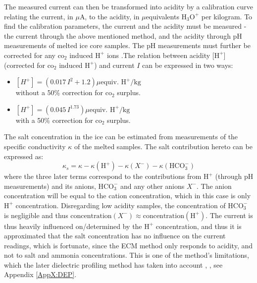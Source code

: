 \documentclass[../../CompleteThesis2/Complete_2ndDraft]{subfiles}
\begin{document}

The measured current can then be transformed into acidity by a calibration curve relating the current, in $\mu$A, to the acidity, in $\mu$equivalents $\text{H}_3\text{O}^+$ per kilogram. To find the calibration parameters, the current and the acidity must be measured - the current through the above mentioned method, and the acidity through pH measurements of melted ice core samples. The pH measurements must further be corrected for any $\text{co}_2$ induced $\text{H}^+$ ions \cite[K. Taylor et al., 1993]{Taylor1993}.The relation between acidity [$\text{H}^+$] (corrected for $\text{co}_2$ induced $\text{H}^+$) and current $I$ can be expressed in two ways:
\begin{itemize}
	\item $[H^+] = (0.017\, I^2 + 1.2) \mu \text{equiv. H}^+ /\text{kg}$\\
	without a 50\% correction for $\text{co}_2$ surplus.
	\item $[H^+] = (0.045\, I^{1.73}) \mu \text{equiv. H}^+ /\text{kg}$\\
	with a 50\% correction for $\text{co}_2$ surplus.
\end{itemize}
The salt concentration in the ice can be estimated from measurements of the specific conductivity $\kappa$ of the melted samples. The salt contribution hereto can be expressed as:
\begin{equation}
	\kappa_s = \kappa - \kappa(\text{H}^+) - \kappa(X^-) - \kappa(\text{HCO}_3^-)
\end{equation}
where the three later terms correspond to the contributions from $\text{H}^+$ (through pH measurements) and its anions\footnotemark, $\text{HCO}_3^-$ and any other anions $X^-$. The anion concentration will be equal to the cation concentration, which in this case is only $\text{H}^+$ concentration. Disregarding low acidity samples, the concentration of $\text{HCO}_3^-$ is negligible and thus  $\text{concentration}(X^-) \approx \text{concentration}(\text{H}^+)$. 
The current is thus heavily influenced on/determined by the $\text{H}^+$ concentration, and thus it is approximated that the salt concentration has no influence on the current readings, which is fortunate, since the ECM method only responds to acidity, and not to salt and ammonia concentrations. This is one of the method's limitations, which the later dielectric profiling method has taken into account \cite[J. Moore and S. Fujita, 1993]{Moore1993}, \cite{Moore1987}, see Appendix \ref{AppX:DEP}.
\end{document}
